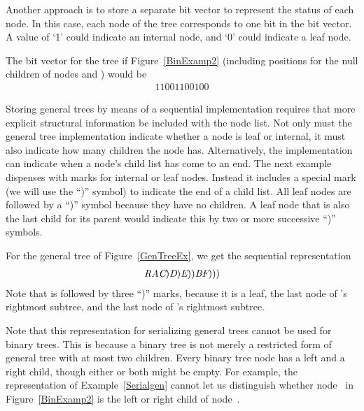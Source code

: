 Another approach is to store a separate bit vector to represent the
status of each node.
In this case, each node of the tree corresponds to one bit in the bit
vector.
A value of `1' could indicate an internal node, and `0' could indicate
a leaf node.

\begin{example}
\label{Serialbitvector}
The bit vector for the tree if Figure~\ref{BinExamp2}
(including positions for the null children of nodes  and
) would be
\begin{eqnarray}
11001100100
\end{eqnarray}
\end{example}

Storing general trees by means of a sequential implementation requires
that more explicit structural information be included with the node
list.
Not only must the general tree implementation indicate whether a node
is leaf or internal, it must also indicate how many children the
node has.
Alternatively, the implementation can indicate when a node's child
list has come to an end.
The next example dispenses with marks for internal or leaf nodes.
Instead it includes a special mark (we will use the ``)'' symbol) to
indicate the end of a child list.
All leaf nodes are followed by a ``)'' symbol because they have no
children.
A leaf node that is also the last child for its parent would indicate
this by two or more successive ``)'' symbols.

\begin{example}
\label{Serialgen}
For the general tree of Figure~\ref{GenTreeEx}, we get the sequential
representation
\begin{eqnarray}
{\textit{R}} {\textit{A}} {\textit{C}}) {\textit{D}}) {\textit{E}})) {\textit{B}}
{\textit{F}})))\label{SeqEqThree}
\end{eqnarray}
\noindent Note that  is followed  by three ``)'' marks,
because it is a leaf, the last node of 's rightmost subtree,
and the last node of 's
rightmost subtree.
\end{example}

Note that this representation for serializing general trees cannot be
used for binary trees.
This is because a binary tree is not merely a restricted form of
general tree with at most two children.
Every binary tree node has a left and a right child, though either or
both might be empty.
For example, the representation of Example~\ref{Serialgen} cannot let
us distinguish whether node~ in Figure~\ref{BinExamp2} is the
left or right child of node~.

